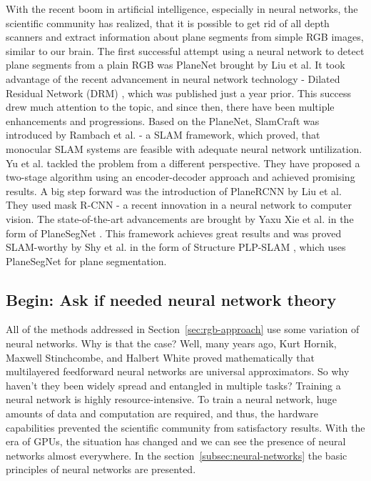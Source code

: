 With the recent boom in artificial intelligence,
especially in neural networks, the scientific community has realized,
that it is possible to get rid of all depth scanners
and extract information about plane segments from simple RGB images, similar to our brain.
The first successful attempt using a neural network to detect plane segments from a plain RGB was
PlaneNet brought by Liu et al. \cite{articlePlaneNet}
It took advantage of the recent advancement
in neural network technology - Dilated Residual Network (DRM) \cite{inproceedingsDetailedResidualNetworks},
which was published just a year prior.
This success drew much attention to the topic, and since then, there have been multiple enhancements and progressions.
Based on the PlaneNet, SlamCraft was introduced by Rambach et al. \cite{inproceedingsSlamCraft} - a SLAM framework,
which proved, that monocular SLAM systems are feasible with adequate neural network untilization.
Yu et al. \cite{inproceedingsEncoderDecoderApproach} tackled the problem from a different perspective.
They have proposed a two-stage algorithm using an encoder-decoder approach and achieved promising results.
A big step forward was the introduction of PlaneRCNN by Liu et al. \cite{articlePlaneRCNN}
They used mask R-CNN \cite{inproceedingsMaskRCNN} - a recent innovation in a neural network to computer vision.
The state-of-the-art advancements are brought by Yaxu Xie et al. in the form of PlaneSegNet \cite{inproceedingsPlaneSegNet}.
This framework achieves great results and was proved SLAM-worthy by
Shy et al. in the form of Structure PLP-SLAM \cite{inproceedingsPLPSLAM}, which uses PlaneSegNet for plane segmentation.

\subsection{Begin: Ask if needed neural network theory}

\par

All of the methods addressed in Section~\ref{sec:rgb-approach} use some variation of neural networks.
Why is that the case?
Well, many years ago, Kurt Hornik, Maxwell Stinchcombe, and Halbert White proved mathematically that multilayered feedforward neural networks are universal approximators. \cite{HORNIK1989359}
So why haven't they been widely spread and entangled in multiple tasks?
Training a neural network is highly resource-intensive.
To train a neural network, huge amounts of data and computation are required, and thus, the hardware capabilities prevented the scientific community from satisfactory results.
With the era of GPUs, the situation has changed and we can see the presence of neural networks almost everywhere.
In the section~\ref{subsec:neural-networks} the basic principles of neural networks are presented.

